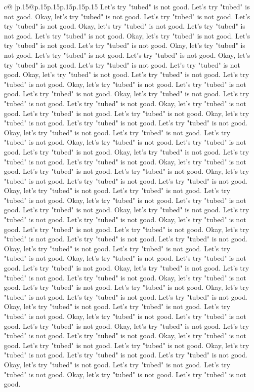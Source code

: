 \documentclass{article}
\begin{document}
{\begin{supertabular}{c@{$\;$}|p{.15\linewidth}@{}p{.15\linewidth}p{.15\linewidth}p{.15\linewidth}p{.15\linewidth}p{.15\linewidth}}
{{{Let's try "tubed" is not good. Let's try "tubed" is not good. Okay, let's try "tubed" is not good. Let's try "tubed" is not good. Let's try "tubed" is not good. Okay, let's try "tubed" is not good. Let's try "tubed" is not good. Let's try "tubed" is not good. Okay, let's try "tubed" is not good. Let's try "tubed" is not good. Let's try "tubed" is not good. Okay, let's try "tubed" is not good. Let's try "tubed" is not good. Let's try "tubed" is not good. Okay, let's try "tubed" is not good. Let's try "tubed" is not good. Let's try "tubed" is not good. Okay, let's try "tubed" is not good. Let's try "tubed" is not good. Let's try "tubed" is not good. Okay, let's try "tubed" is not good. Let's try "tubed" is not good. Let's try "tubed" is not good. Okay, let's try "tubed" is not good. Let's try "tubed" is not good. Let's try "tubed" is not good. Okay, let's try "tubed" is not good. Let's try "tubed" is not good. Let's try "tubed" is not good. Okay, let's try "tubed" is not good. Let's try "tubed" is not good. Let's try "tubed" is not good. Okay, let's try "tubed" is not good. Let's try "tubed" is not good. Let's try "tubed" is not good. Okay, let's try "tubed" is not good. Let's try "tubed" is not good. Let's try "tubed" is not good. Okay, let's try "tubed" is not good. Let's try "tubed" is not good. Let's try "tubed" is not good. Okay, let's try "tubed" is not good. Let's try "tubed" is not good. Let's try "tubed" is not good. Okay, let's try "tubed" is not good. Let's try "tubed" is not good. Let's try "tubed" is not good. Okay, let's try "tubed" is not good. Let's try "tubed" is not good. Let's try "tubed" is not good. Okay, let's try "tubed" is not good. Let's try "tubed" is not good. Let's try "tubed" is not good. Okay, let's try "tubed" is not good. Let's try "tubed" is not good. Let's try "tubed" is not good. Okay, let's try "tubed" is not good. Let's try "tubed" is not good. Let's try "tubed" is not good. Okay, let's try "tubed" is not good. Let's try "tubed" is not good. Let's try "tubed" is not good. Okay, let's try "tubed" is not good. Let's try "tubed" is not good. Let's try "tubed" is not good. Okay, let's try "tubed" is not good. Let's try "tubed" is not good. Let's try "tubed" is not good. Okay, let's try "tubed" is not good. Let's try "tubed" is not good. Let's try "tubed" is not good. Okay, let's try "tubed" is not good. Let's try "tubed" is not good. Let's try "tubed" is not good. Okay, let's try "tubed" is not good. Let's try "tubed" is not good. Let's try "tubed" is not good. Okay, let's try "tubed" is not good. Let's try "tubed" is not good. Let's try "tubed" is not good. Okay, let's try "tubed" is not good. Let's try "tubed" is not good. Let's try "tubed" is not good. Okay, let's try "tubed" is not good. Let's try "tubed" is not good. Let's try "tubed" is not good. Okay, let's try "tubed" is not good. Let's try "tubed" is not good. Let's try "tubed" is not good. Okay, let's try "tubed" is not good. Let's try "tubed" is not good. Let's try "tubed" is not good. Okay, let's try "tubed" is not good. Let's try "tubed" is not good. Let's try "tubed" is not good. Okay, let's try "tubed" is not good. Let's try "tubed" is not good. }}}
\end{supertabular}}
\end{document}
